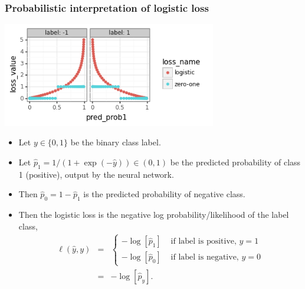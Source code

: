 \documentclass{beamer}
\begin{document}
\begin{frame}
  \frametitle{Probabilistic interpretation of logistic loss}
  \includegraphics[width=0.7\textwidth]{2022-02-15-simplex-binary-loss-prob.png}

  \begin{itemize}
  \item Let $y\in\{0,1\}$ be the binary class label.
  \item Let $\hat p_1=1/(1+\exp(-\hat y))\in (0,1)$ be the predicted probability
    of class 1 (positive), output by the neural network.
  \item Then $\hat p_0 = 1-\hat p_1$ is the predicted probability of
    negative class.
  \item Then the logistic loss is the negative log
    probability/likelihood of the label class,
    \begin{eqnarray*}
      \ell(\hat y, y) 
        &=& \begin{cases}
              -\log[\hat p_1] & \text{ if label is positive, } y=1 \\
              -\log[\hat p_0] & \text{ if label is negative, } y=0
            \end{cases}\\
        &=& -\log[\hat p_y].
    \end{eqnarray*}
  \end{itemize}

\end{frame}
\end{document}
